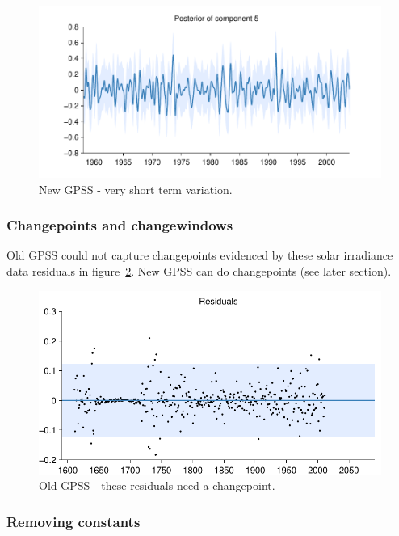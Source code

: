 \documentclass{article}
\begin{document}
\begin{figure}[h]
\centering
\includegraphics[width=0.98\columnwidth]{figures/03-mauna/03-mauna_5}
\caption{New GPSS - very short term variation.}
\label{fig:short}
\end{figure}

\subsubsection{Changepoints and changewindows}

Old GPSS could not capture changepoints evidenced by these solar irradiance data residuals in figure~\ref{fig:not_cp}.
New GPSS can do changepoints (see later section).

\begin{figure}[h]
\centering
\includegraphics[width=0.98\columnwidth]{figures/old-gpss/02-solar-s_resid}
\caption{Old GPSS - these residuals need a changepoint.}
\label{fig:not_cp}
\end{figure}

\subsubsection{Removing constants}
\end{document}
